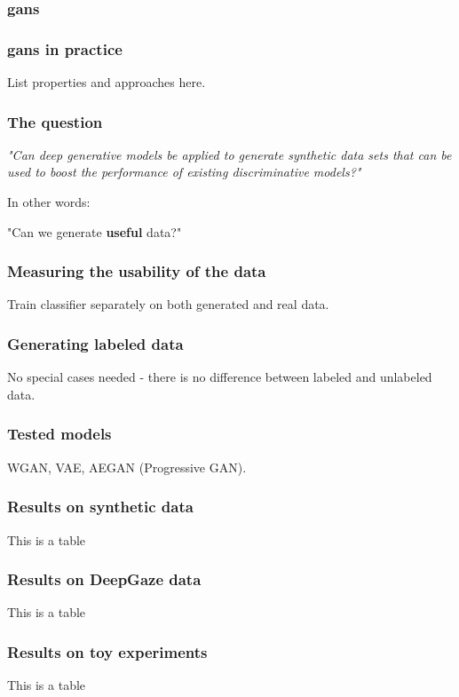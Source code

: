 \documentclass{beamer}
\begin{document}
\begin{messageframe}
    \frametitle{\acrfull{gans}}
\end{messageframe}

\begin{messageframe}
    \frametitle{\acrshort{gans} in practice}
    List properties and approaches here.
\end{messageframe}


\begin{messageframe}
    \frametitle{The question}
    \textit{"Can deep generative models be applied to generate synthetic data sets that can be used to boost the performance of existing discriminative models?"}
    
    \vspace{1.5cm}
    
    In other words:
    
    "Can we generate \textbf{useful} data?"
\end{messageframe}

\begin{messageframe}
    \frametitle{Measuring the usability of the data}
    Train classifier separately on both generated and real data.
\end{messageframe}

\begin{messageframe}
    \frametitle{Generating labeled data}
    No special cases needed - there is no difference between labeled and unlabeled data.
\end{messageframe}


\begin{messageframe}
    \frametitle{Tested models}
    WGAN, VAE, AEGAN (Progressive GAN).
\end{messageframe}



\begin{messageframe}
    \frametitle{Results on synthetic data}
    This is a table
\end{messageframe}

\begin{messageframe}
    \frametitle{Results on DeepGaze data}
    This is a table
\end{messageframe}

\begin{messageframe}
    \frametitle{Results on toy experiments}
    This is a table
\end{messageframe}




\end{document}
